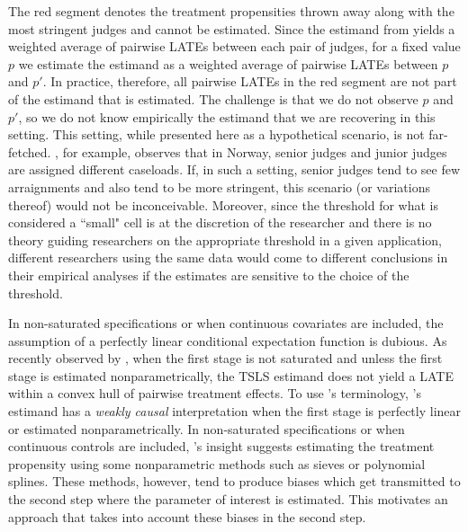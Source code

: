 \vspace{1.5em}
\begin{center}
\end{center}
\vspace{1.5em}

The red segment denotes the treatment propensities thrown away along with the most stringent judges and cannot be estimated. Since the estimand from \citet{kolesarcowles} yields a weighted average of pairwise LATEs between each pair of judges, for a fixed value $p$ we estimate the estimand as a weighted average of pairwise LATEs between $p$ and $p'$. In practice, therefore, all pairwise LATEs in the red segment are not part of the estimand that is estimated. The challenge is that we do not observe $p$ and $p'$, so we do not know empirically the estimand that we are recovering in this setting. This setting, while presented here as a hypothetical scenario, is not far-fetched. \citet{bhuller}, for example, observes that in Norway, senior judges and junior judges are assigned different caseloads. If, in such a setting, senior judges tend to see few arraignments and also tend to be more stringent, this scenario (or variations thereof) would not be inconceivable. 
Moreover, since the threshold for what is considered a ``small" cell is at the discretion of the researcher and there is no theory guiding researchers on the appropriate threshold in a given application, different researchers using the same data would come to different conclusions in their empirical analyses if the estimates are sensitive to the choice of the threshold. 

In non-saturated specifications or when continuous covariates are included, the assumption of a perfectly linear conditional expectation function is dubious. As recently observed by \citet{blandhol2022tsls}, when the first stage is not saturated and unless the first stage is estimated nonparametrically, the TSLS estimand does not yield a LATE within a convex hull of pairwise treatment effects. To use \citet{blandhol2022tsls}'s terminology, \citet{kolesarcowles}'s estimand has a \textit{weakly causal} interpretation when the first stage is perfectly linear or estimated nonparametrically. In non-saturated specifications or when continuous controls are included, \citet{blandhol2022tsls}'s insight suggests estimating the treatment propensity using some nonparametric methods such as sieves or polynomial splines. These methods, however, tend to produce biases which get transmitted to the second step where the parameter of interest is estimated. This motivates an approach that takes into account these biases in the second step. 

